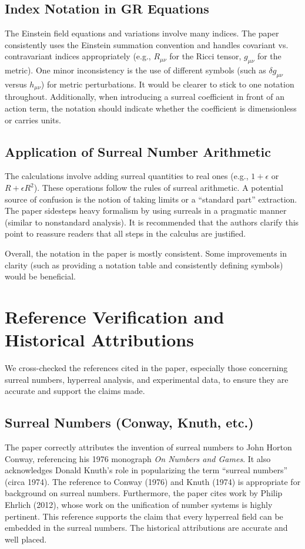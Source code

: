 \documentclass{article}
\begin{document}
\subsection*{Index Notation in GR Equations}
The Einstein field equations and variations involve many indices. The paper consistently uses the Einstein summation convention and handles covariant vs. contravariant indices appropriately (e.g., $R_{\mu\nu}$ for the Ricci tensor, $g_{\mu\nu}$ for the metric). One minor inconsistency is the use of different symbols (such as $\delta g_{\mu\nu}$ versus $h_{\mu\nu}$) for metric perturbations. It would be clearer to stick to one notation throughout. Additionally, when introducing a surreal coefficient in front of an action term, the notation should indicate whether the coefficient is dimensionless or carries units.

\subsection*{Application of Surreal Number Arithmetic}
The calculations involve adding surreal quantities to real ones (e.g., $1 + \epsilon$ or $R + \epsilon R^2$). These operations follow the rules of surreal arithmetic. A potential source of confusion is the notion of taking limits or a ``standard part'' extraction. The paper sidesteps heavy formalism by using surreals in a pragmatic manner (similar to nonstandard analysis). It is recommended that the authors clarify this point to reassure readers that all steps in the calculus are justified.

Overall, the notation in the paper is mostly consistent. Some improvements in clarity (such as providing a notation table and consistently defining symbols) would be beneficial.

\section{Reference Verification and Historical Attributions}

We cross-checked the references cited in the paper, especially those concerning surreal numbers, hyperreal analysis, and experimental data, to ensure they are accurate and support the claims made.

\subsection*{Surreal Numbers (Conway, Knuth, etc.)}
The paper correctly attributes the invention of surreal numbers to John Horton Conway, referencing his 1976 monograph \emph{On Numbers and Games}. It also acknowledges Donald Knuth’s role in popularizing the term “surreal numbers” (circa 1974). The reference to Conway (1976) and Knuth (1974) is appropriate for background on surreal numbers. Furthermore, the paper cites work by Philip Ehrlich (2012), whose work on the unification of number systems is highly pertinent. This reference supports the claim that every hyperreal field can be embedded in the surreal numbers. The historical attributions are accurate and well placed.
\end{document}
